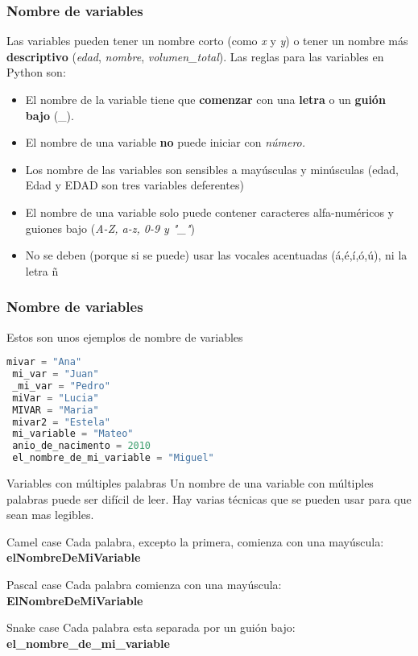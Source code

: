 \begin{frame}[fragile]
  \frametitle{Nombre de variables}

  \vspace{\baselineskip}
  Las variables pueden tener un nombre corto (como \textit{x} y \textit{y})
  o tener un nombre más \textbf{descriptivo} (\textit{edad}, \textit{nombre},
  \textit{volumen\_total}). Las reglas para las variables en Python son:
  \pausa

  \vspace{\baselineskip}
  \begin{itemize}
    \item El nombre de la variable tiene que \textbf{comenzar} con una
      \textbf{letra} o un \textbf{guión bajo} (\_).
    \pausa
    \item El nombre de una variable \textbf{no} puede iniciar con
      \textit{número.}
    \pausa
    \item Los nombre de las variables son sensibles a mayúsculas y minúsculas
      (edad, Edad y EDAD son tres variables deferentes)
    \pausa
    \item El nombre de una variable solo puede contener caracteres
      alfa-numéricos y guiones bajo (\textit{A-Z, a-z, 0-9 y "\_"})
    \pausa
    \item No se deben (porque si se puede) usar las vocales acentuadas
      (á,é,í,ó,ú), ni la letra ñ
  \end{itemize}
\end{frame}

\begin{frame}[fragile]
  \frametitle{Nombre de variables}

  Estos son unos ejemplos de nombre de variables

  \vspace{\baselineskip}
  \begin{lstlisting}[language=Python]
 mivar = "Ana"
 mi_var = "Juan"
 _mi_var = "Pedro"
 miVar = "Lucia"
 MIVAR = "Maria"
 mivar2 = "Estela"
 mi_variable = "Mateo"
 anio_de_nacimento = 2010
 el_nombre_de_mi_variable = "Miguel"
  \end{lstlisting}
\end{frame}

\begin{frame}[c]{Variables con múltiples palabras}
  Un nombre de una variable con múltiples palabras puede ser difícil de leer.
  Hay varias técnicas que se pueden usar para que sean mas legibles.
  \pausa
  \begin{block}{Camel case}
    Cada palabra, excepto la primera, comienza con una mayúscula:
    \textbf{elNombreDeMiVariable}
  \end{block}
  \pausa
  \begin{block}{Pascal case}
    Cada palabra comienza con una mayúscula:
    \textbf{ElNombreDeMiVariable}
  \end{block}
  \pausa
  \begin{exampleblock}{Snake case}
    Cada palabra esta separada por un guión bajo:
    \textbf{el\_nombre\_de\_mi\_variable}
  \end{exampleblock}
\end{frame}

